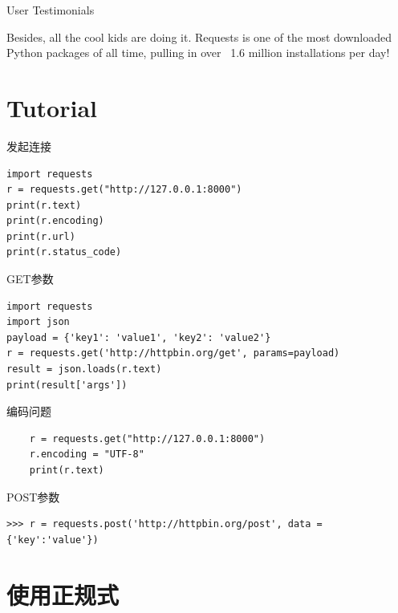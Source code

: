 \documentclass{beamer}
\begin{document}
\begin{frame}[t]{User Testimonials}

Besides, all the cool kids are doing it. Requests is one of the most downloaded Python packages of all time, pulling in over ~1.6 million installations per day!

\end{frame}

\section{Tutorial} %
\label{sec:Tutorial}

\begin{frame}[t,fragile]{发起连接}
\begin{verbatim}
import requests
r = requests.get("http://127.0.0.1:8000")
print(r.text)
print(r.encoding)
print(r.url)
print(r.status_code)
\end{verbatim}
    
\end{frame}

\begin{frame}[t,fragile]{GET参数}
    \scriptsize
    \begin{verbatim}
import requests
import json
payload = {'key1': 'value1', 'key2': 'value2'}
r = requests.get('http://httpbin.org/get', params=payload)
result = json.loads(r.text)
print(result['args'])

    \end{verbatim}

\end{frame}
\begin{frame}[t,fragile]{编码问题}
    \begin{verbatim}
    r = requests.get("http://127.0.0.1:8000")
    r.encoding = "UTF-8"
    print(r.text)
    \end{verbatim}
\end{frame}
\begin{frame}[t,fragile]{POST参数}
    \scriptsize
    \begin{verbatim}
>>> r = requests.post('http://httpbin.org/post', data = {'key':'value'})
    \end{verbatim}
\end{frame}
\section{使用正规式} %
\label{sec:使用正规式}
\end{document}
